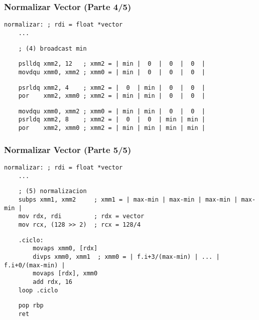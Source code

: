 \documentclass[aspectratio=169]{beamer}
\begin{document}
\begin{frame}[fragile,t]
    \frametitle{Normalizar Vector (Parte 4/5)}
    \footnotesize
    \begin{verbatim}
normalizar: ; rdi = float *vector
    ...
    \end{verbatim}
    \small
    \begin{verbatim}
    ; (4) broadcast min
    \end{verbatim}
    \vspace{-1cm}
    \begin{verbatim}
    pslldq xmm2, 12   ; xmm2 = | min |  0  |  0  |  0  |
    movdqu xmm0, xmm2 ; xmm0 = | min |  0  |  0  |  0  |
    \end{verbatim}
    \vspace{-1cm} %
    \begin{verbatim}
    psrldq xmm2, 4    ; xmm2 = |  0  | min |  0  |  0  |
    por    xmm2, xmm0 ; xmm2 = | min | min |  0  |  0  |
    \end{verbatim}
    \vspace{-1cm} %
    \begin{verbatim}
    movdqu xmm0, xmm2 ; xmm0 = | min | min |  0  |  0  |
    psrldq xmm2, 8    ; xmm2 = |  0  |  0  | min | min |
    por    xmm2, xmm0 ; xmm2 = | min | min | min | min |
    \end{verbatim}
\end{frame}

\begin{frame}[fragile,t]
    \frametitle{Normalizar Vector (Parte 5/5)}
    \footnotesize
    \begin{verbatim}
normalizar: ; rdi = float *vector
    ...
    \end{verbatim}
    \small
    \vspace{-0.8cm}
    \begin{verbatim}
    ; (5) normalizacion
    subps xmm1, xmm2     ; xmm1 = | max-min | max-min | max-min | max-min |
    mov rdx, rdi         ; rdx = vector
    mov rcx, (128 >> 2)  ; rcx = 128/4
    \end{verbatim}
    \vspace{-0.8cm} \pause
    \begin{verbatim}
    .ciclo:
        movaps xmm0, [rdx]
        divps xmm0, xmm1  ; xmm0 = | f.i+3/(max-min) | ... | f.i+0/(max-min) |
        movaps [rdx], xmm0
        add rdx, 16
    loop .ciclo
    \end{verbatim}
    \vspace{-0.8cm} \pause
    \begin{verbatim}
    pop rbp
    ret
    \end{verbatim}
\end{frame}
\end{document}
